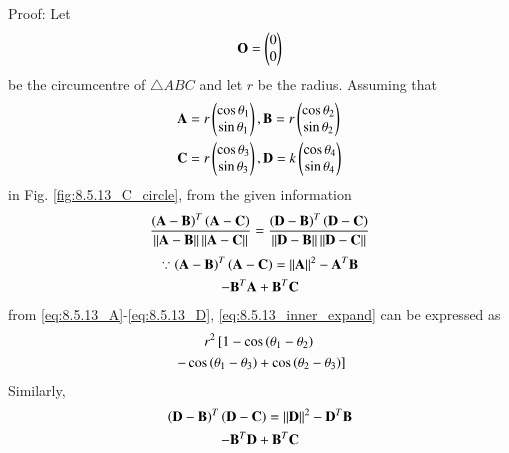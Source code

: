 \item {Proof: } Let 
\begin{align}
\mathbf{O} = \begin{pmatrix}0\\0\end{pmatrix}
\end{align}
%
be the circumcentre of $\triangle ABC$ and let $r$ be the radius.  Assuming that
\begin{align}
\label{eq:8.5.13_A}
\mathbf{A} &= r\begin{pmatrix}\cos \theta_1\\\sin\theta_1\end{pmatrix},
\mathbf{B} = r\begin{pmatrix}\cos \theta_2\\\sin\theta_2\end{pmatrix}
\\
\mathbf{C} &= r\begin{pmatrix}\cos \theta_3\\\sin\theta_3\end{pmatrix},
\mathbf{D} = k\begin{pmatrix}\cos \theta_4\\\sin\theta_4\end{pmatrix}
\label{eq:8.5.13_D}
\end{align}
in Fig. \ref{fig:8.5.13_C_circle}, from the given information
\begin{align}
 \frac{\left(\mathbf{A}-\mathbf{B}\right)^T\left(\mathbf{A}-\mathbf{C}\right)}{\left\lVert\mathbf{A}-\mathbf{B}\right\rVert\left\lVert\mathbf{A}-\mathbf{C}\right\rVert} = 
 \frac{\left(\mathbf{D}-\mathbf{B}\right)^T\left(\mathbf{D}-\mathbf{C}\right)}{\left\lVert\mathbf{D}-\mathbf{B}\right\rVert\left\lVert\mathbf{D}-\mathbf{C}\right\rVert} 
\label{eq:8.5.13_inner}
\end{align}
\begin{multline}
\because \left(\mathbf{A}-\mathbf{B}\right)^T\left(\mathbf{A}-\mathbf{C}\right) = \left\lVert\mathbf{A}\right\rVert^2 - \mathbf{A}^T\mathbf{B}
\\
- \mathbf{B}^T\mathbf{A}+ \mathbf{B}^T\mathbf{C}
\label{eq:8.5.13_inner_expand}
\end{multline}
from \eqref{eq:8.5.13_A}-\eqref{eq:8.5.13_D}, \eqref{eq:8.5.13_inner_expand} can be expressed as
\begin{multline}
r^2{}\left[1 - \cos \left(\theta_1-\theta_2\right) \right.
\\
{}\left.-  \cos \left(\theta_1-\theta_3\right)+ \cos \left(\theta_2-\theta_3\right)\right]
\label{eq:8.5.13_abc_inner}
\end{multline}
%
Similarly, 
\begin{multline}
 \left(\mathbf{D}-\mathbf{B}\right)^T\left(\mathbf{D}-\mathbf{C}\right) = \left\lVert\mathbf{D}\right\rVert^2 - \mathbf{D}^T\mathbf{B}
\\
- \mathbf{B}^T\mathbf{D}+ \mathbf{B}^T\mathbf{C}
\label{eq:8.5.13_inner_expand}
\end{multline}



